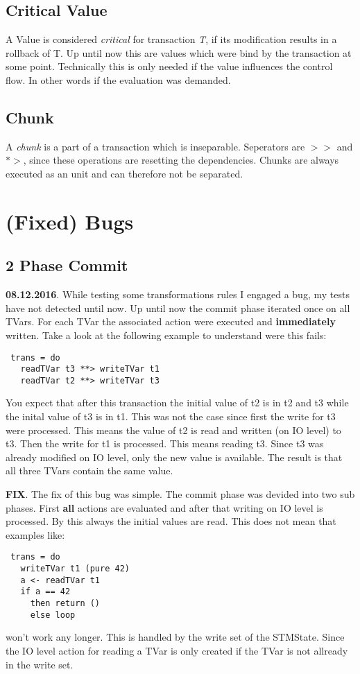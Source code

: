 \documentclass[a4paper,10pt]{article}
\begin{document}
\subsection{Critical Value}
A Value is considered \textit{critical} for transaction \textit{T}, if its modification results in a rollback of T.
Up until now this are values which were bind by the transaction at some point. Technically this is only needed if 
the value influences the control flow. In other words if the evaluation was demanded.
\subsection{Chunk}
A \textit{chunk} is a part of a transaction which is inseparable. Seperators are $>>$ and $*>$, since 
these operations are resetting the dependencies. Chunks are always executed as an unit and can therefore not be
separated.


\section{(Fixed) Bugs}
\subsection{2 Phase Commit}
\textbf{08.12.2016}. While testing some transformations rules I engaged a bug, my tests have not detected until now.
Up until now the commit phase iterated once on all TVars. For each TVar the associated action were executed and 
\textbf{immediately} written. Take a look at the following example to understand were this fails:
\begin{lstlisting}
 trans = do
   readTVar t3 **> writeTVar t1
   readTVar t2 **> writeTVar t3
\end{lstlisting}
You expect that after this transaction the initial value of t2 is in t2 and t3 while the inital value of t3 is in t1.
This was not the case since first the write for t3 were processed. This means the value of t2 is read and written (on 
IO level) to t3. Then the write for t1 is processed. This means reading t3. Since t3 was already modified on IO level,
only the new value is available. The result is that all three TVars contain the same value.

\textbf{FIX}. The fix of this bug was simple. The commit phase was devided into two sub phases. First \textbf{all} actions 
are evaluated and after that writing on IO level is processed. By this always the initial values are read. 
This does not mean that examples like:
\begin{lstlisting}
 trans = do 
   writeTVar t1 (pure 42)
   a <- readTVar t1 
   if a == 42 
     then return ()
     else loop
\end{lstlisting}
won't work any longer. This is handled by the write set of the STMState. Since the IO level action for reading a TVar is
only created if the TVar is not allready in the write set.
\end{document}
